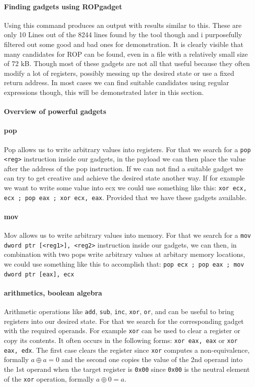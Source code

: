 \documentclass[journal=tosc,submission]{iacrtrans}
\begin{document}
\paragraph{Finding gadgets using ROPgadget}
Using this command produces an output with results similar to this.
These are only 10 Lines out of the 8244 lines found by the tool though and i purposefully filtered out some good and bad ones for demonstration. It is clearly visible that many candidates for ROP can be found, even in a file with a relatively small size of 72 kB. Though most of these gadgets are not all that useful because they often modify a lot of registers, possibly messing up the desired state or use a fixed return address. In most cases we can find suitable candidates using regular expressions though, this will be demonstrated later in this section.
\paragraph{Overview of powerful gadgets}
\paragraph{pop}
Pop allows us to write arbitrary values into registers. For that we search for a \Verb+pop <reg>+ instruction inside our gadgets, in the payload we can then place the value after the address of the pop instruction. If we can not find a suitable gadget we can try to get creative and achieve the desired state another way. If for example we want to write some value into ecx we could use something like this: \Verb+xor ecx, ecx ; pop eax ; xor ecx, eax+. Provided that we have these gadgets available.
\paragraph{mov}
Mov allows us to write arbitrary values into memory. For that we search for a \Verb+mov dword ptr [<reg1>], <reg2>+ instruction inside our gadgets, we can then, in combination with two pops write arbitrary values at arbitary memory locations, we could use something like this to accomplish that: \Verb+pop ecx ; pop eax ; mov dword ptr [eax], ecx+
\paragraph{arithmetics, boolean algebra}
Arithmetic operations like \Verb+add+, \Verb+sub+, \Verb+inc+, \Verb+xor+, \Verb+or+, and can be useful to bring registers into our desired state. For that we search for the corresponding gadget with the required operands. For example \Verb+xor+ can be used to clear a register or copy its contents. It often occurs in the following forms: \Verb+xor eax, eax+ or \Verb+xor eax, edx+. The first case clears the register since \Verb+xor+ computes a non-equivalence, formally $a \oplus a = 0$ and the second one copies the value of the 2nd operand into the 1st operand when the target register is \Verb+0x00+ since \Verb+0x00+ is the neutral element of the \Verb+xor+ operation, formally $a \oplus 0 = a$.
\end{document}
